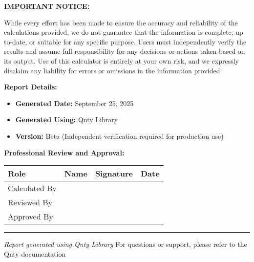 \documentclass[11pt,a4paper]{article}
\begin{document}
\noindent\textbf{IMPORTANT NOTICE:}

\noindent While every effort has been made to ensure the accuracy and reliability of the calculations provided, we do not guarantee that the information is complete, up-to-date, or suitable for any specific purpose. Users must independently verify the results and assume full responsibility for any decisions or actions taken based on its output. Use of this calculator is entirely at your own risk, and we expressly disclaim any liability for errors or omissions in the information provided.

\vspace{1em}

\noindent\textbf{Report Details:}
\begin{itemize}
\item \textbf{Generated Date:} September 25, 2025
\item \textbf{Generated Using:} Qnty Library
\item \textbf{Version:} Beta (Independent verification required for production use)
\end{itemize}

\vspace{2em}

\noindent\textbf{Professional Review and Approval:}

\vspace{1em}

\begin{longtable}{|p{3cm}|p{4cm}|p{4cm}|p{2.5cm}|}
\hline
\textbf{Role} & \textbf{Name} & \textbf{Signature} & \textbf{Date} \\
\hline
\hline
Calculated By & \rule{0pt}{1.5cm} & & \\
\hline
Reviewed By & \rule{0pt}{1.5cm} & & \\
\hline
Approved By & \rule{0pt}{1.5cm} & & \\
\hline
\end{longtable}

\vspace{1em}

\begin{center}
\rule{\textwidth}{0.4pt}
\vspace{0.5em}
\textit{Report generated using Qnty Library}
\vspace{0.5em}
{\footnotesize For questions or support, please refer to the Qnty documentation}
\end{center}
\end{document}
